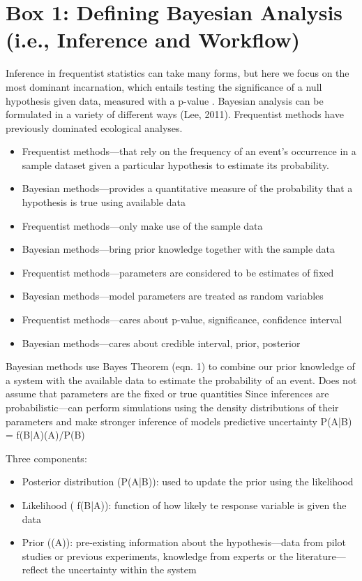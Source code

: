 \documentclass{article}
\begin{document}
\section* {Box 1: Defining Bayesian Analysis (i.e., Inference and Workflow)}
Inference in frequentist statistics can take many forms, but here we focus on the most dominant incarnation, which entails testing the significance of a null hypothesis given data, measured with a p-value \citep{Zyl2018}. Bayesian analysis can be formulated in a variety of different ways (Lee, 2011). Frequentist methods have previously dominated ecological analyses.
\begin{itemize}

\item Frequentist methods—that rely on the frequency of an event's occurrence in a sample dataset given a particular hypothesis to estimate its probability.
\item Bayesian methods—provides a quantitative measure of the probability that a hypothesis is true using available data
\item Frequentist methods—only make use of the sample data
\item Bayesian methods—bring prior knowledge together with the sample data
\item Frequentist methods—parameters  are considered to be estimates of fixed
\item Bayesian methods—model parameters are treated as random variables
\item Frequentist methods—cares about p-value, significance, confidence interval
\item Bayesian methods—cares about credible interval, prior, posterior
\end{itemize}
Bayesian methods use Bayes Theorem (eqn. 1) to combine our prior knowledge of a system with the available data to estimate the probability of an event. 
Does not assume that parameters are the fixed or true quantities
Since inferences are probabilistic—can perform simulations using the density distributions of their parameters and make stronger inference of models predictive uncertainty
P(A|B) = f(B|A)(A)/P(B)
\par Three components:
\begin{itemize}
\item Posterior distribution (P(A|B)): used to update the prior using the likelihood
\item Likelihood ( f(B|A)): function of how likely te response variable is given the data
\item Prior ((A)): pre-existing information about the hypothesis—data from pilot studies or previous experiments, knowledge from experts or the literature—reflect the uncertainty within the system
\end{itemize}
\end{document}
